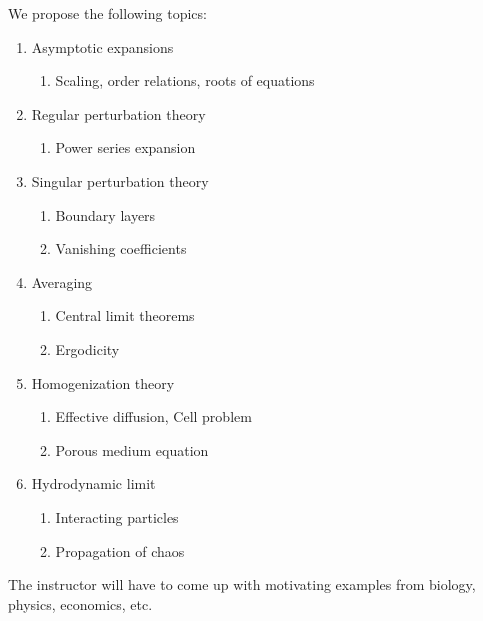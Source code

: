 \documentclass[12pt]{amsart}
\begin{document}
We propose the following topics:
\begin{enumerate}
    \item Asymptotic expansions
        \begin{enumerate}
            \item Scaling, order relations, roots of equations
        \end{enumerate}
    \item Regular perturbation theory
        \begin{enumerate}
            \item Power series expansion
        \end{enumerate}
    \item Singular perturbation theory
        \begin{enumerate}
            \item Boundary layers
            \item Vanishing coefficients 
        \end{enumerate}
    \item Averaging
        \begin{enumerate}
            \item Central limit theorems
            \item Ergodicity
        \end{enumerate}
    \item Homogenization theory
        \begin{enumerate}
            \item Effective diffusion, Cell problem
            \item Porous medium equation
        \end{enumerate}
    \item Hydrodynamic limit
        \begin{enumerate}
            \item Interacting particles
            \item Propagation of chaos
        \end{enumerate}
\end{enumerate}

The instructor will have to come up with motivating examples from biology, physics,
economics, etc.




\printbibliography 
%
%
\end{document}

